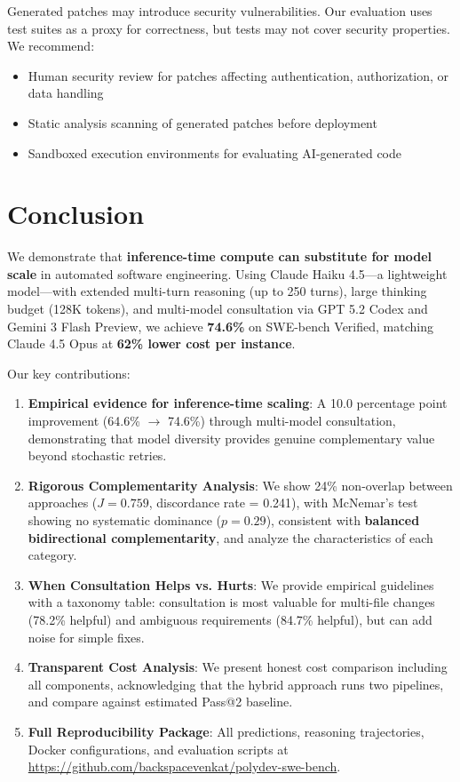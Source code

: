 \documentclass[11pt,a4paper]{article}
\begin{document}
Generated patches may introduce security vulnerabilities. Our evaluation uses test suites as a proxy for correctness, but tests may not cover security properties. We recommend:
\begin{itemize}
    \item Human security review for patches affecting authentication, authorization, or data handling
    \item Static analysis scanning of generated patches before deployment
    \item Sandboxed execution environments for evaluating AI-generated code
\end{itemize}

\section{Conclusion}

We demonstrate that \textbf{inference-time compute can substitute for model scale} in automated software engineering. Using Claude Haiku 4.5---a lightweight model---with extended multi-turn reasoning (up to 250 turns), large thinking budget (128K tokens), and multi-model consultation via GPT 5.2 Codex and Gemini 3 Flash Preview, we achieve \textbf{74.6\%} on SWE-bench Verified, matching Claude 4.5 Opus at \textbf{62\% lower cost per instance}.

Our key contributions:
\begin{enumerate}
    \item \textbf{Empirical evidence for inference-time scaling}: A 10.0 percentage point improvement (64.6\% $\rightarrow$ 74.6\%) through multi-model consultation, demonstrating that model diversity provides genuine complementary value beyond stochastic retries.
    
    \item \textbf{Rigorous Complementarity Analysis}: We show 24\% non-overlap between approaches ($J = 0.759$, discordance rate = 0.241), with McNemar's test showing no systematic dominance ($p = 0.29$), consistent with \textbf{balanced bidirectional complementarity}, and analyze the characteristics of each category.

    \item \textbf{When Consultation Helps vs. Hurts}: We provide empirical guidelines with a taxonomy table: consultation is most valuable for multi-file changes (78.2\% helpful) and ambiguous requirements (84.7\% helpful), but can add noise for simple fixes.

    \item \textbf{Transparent Cost Analysis}: We present honest cost comparison including all components, acknowledging that the hybrid approach runs two pipelines, and compare against estimated Pass@2 baseline.

    \item \textbf{Full Reproducibility Package}: All predictions, reasoning trajectories, Docker configurations, and evaluation scripts at \url{https://github.com/backspacevenkat/polydev-swe-bench}.
\end{enumerate}
\end{document}
